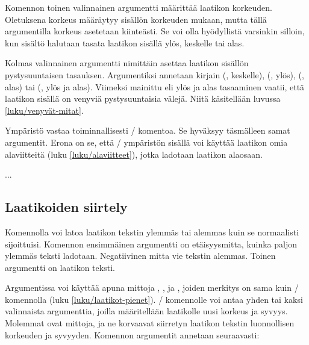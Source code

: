 \noindent
Komennon toinen valinnainen argumentti  määrittää
laatikon korkeuden. Oletuksena korkeus määräytyy sisällön korkeuden
mukaan, mutta tällä argumentilla korkeus asetetaan kiinteästi. Se voi
olla hyödyllistä varsinkin silloin, kun sisältö halutaan tasata laatikon
sisällä ylös, keskelle tai alas.

Kolmas valinnainen argumentti  nimittäin asettaa
laatikon sisällön pystysuuntaisen tasauksen. Argumentiksi annetaan
kirjain  (, keskelle), 
(, ylös),  (, alas) tai
 (, ylös ja alas). Viimeksi mainittu eli ylös
ja alas tasaaminen vaatii, että laatikon sisällä on venyviä
pystysuuntaisia välejä. Niitä käsitellään luvussa
\ref{luku/venyvät-mitat}.

Ympäristö  vastaa toiminnallisesti
\-/ komentoa. Se hyväksyy täsmälleen samat argumentit.
Erona on se, että \-/ ympäristön sisällä voi käyttää
laatikon omia alaviitteitä (luku \ref{luku/alaviitteet}), jotka ladotaan
laatikon alaosaan.

\begin{koodilohkosis}
\begin{minipage}[sijainti][korkeus][sisäsijainti]{leveys}
  ...
\end{minipage}
\end{koodilohkosis}

\subsection{Laatikoiden siirtely}

Komennolla  voi latoa laatikon tekstin ylemmäs tai
alemmas kuin se normaalisti sijoittuisi. Komennon ensimmäinen argumentti
on etäisyysmitta, kuinka paljon ylemmäs teksti ladotaan. Negatiivinen
mitta vie tekstin alemmas. Toinen argumentti on laatikon teksti.

\begin{koodilohkosis}
\raisebox{etäisyysmitta}{teksti}
\end{koodilohkosis}

\noindent
Argumentissa  voi käyttää apuna mittoja
, ,  ja ,
joiden merkitys on sama kuin \-/ komennolla (luku
\ref{luku/laatikot-pienet}). \-/ komennolle voi antaa
yhden tai kaksi valinnaista argumenttia, joilla määritellään laatikolle
uusi korkeus ja syvyys. Molemmat ovat mittoja, ja ne korvaavat siirretyn
laatikon tekstin luonnollisen korkeuden ja syvyyden. Komennon argumentit
annetaan seuraavasti:

